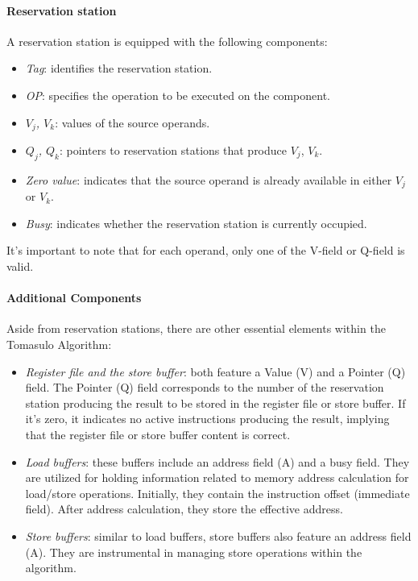 \paragraph*{Reservation station}
A reservation station is equipped with the following components:
\begin{itemize}
    \item \textit{Tag}: identifies the reservation station.
    \item \textit{OP}: specifies the operation to be executed on the component.
    \item \textit{$V_j$, $V_k$}: values of the source operands.
    \item \textit{$Q_j$, $Q_k$}: pointers to reservation stations that produce $V_j$, $V_k$.
    \item \textit{Zero value}: indicates that the source operand is already available in either $V_j$ or $V_k$.
    \item \textit{Busy}: indicates whether the reservation station is currently occupied.
\end{itemize}
It's important to note that for each operand, only one of the V-field or Q-field is valid.


\paragraph*{Additional Components}
Aside from reservation stations, there are other essential elements within the Tomasulo Algorithm:
\begin{itemize}
    \item \textit{Register file and the store buffer}: both feature a Value (V) and a Pointer (Q) field. 
        The Pointer (Q) field corresponds to the number of the reservation station producing the result to be stored in the register file or store buffer. 
            If it's zero, it indicates no active instructions producing the result, implying that the register file or store buffer content is correct.
    \item \textit{Load buffers}: these buffers include an address field (A) and a busy field. 
        They are utilized for holding information related to memory address calculation for load/store operations. 
        Initially, they contain the instruction offset (immediate field). 
        After address calculation, they store the effective address.
    \item \textit{Store buffers}: similar to load buffers, store buffers also feature an address field (A).
        They are instrumental in managing store operations within the algorithm. 
\end{itemize}

